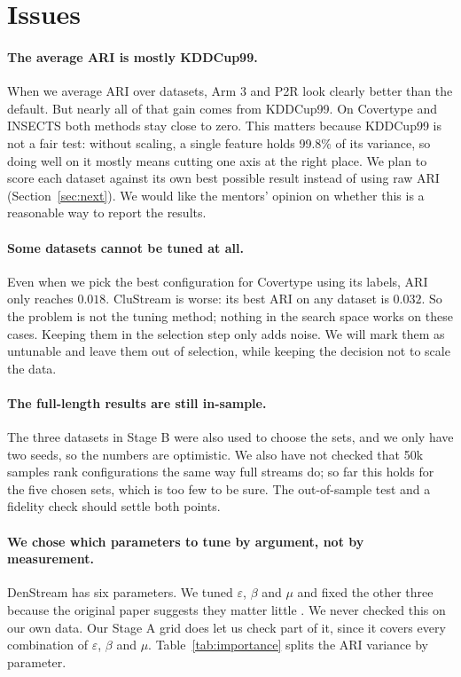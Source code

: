 \section{Issues}

\paragraph{The average ARI is mostly KDDCup99.}
When we average ARI over datasets, Arm 3 and P2R look clearly better than the default. But nearly all of that gain comes from KDDCup99. On Covertype and INSECTS both methods stay close to zero. This matters because KDDCup99 is not a fair test: without scaling, a single feature holds 99.8\% of its variance, so doing well on it mostly means cutting one axis at the right place. We plan to score each dataset against its own best possible result instead of using raw ARI (Section~\ref{sec:next}). We would like the mentors' opinion on whether this is a reasonable way to report the results.

\paragraph{Some datasets cannot be tuned at all.}
Even when we pick the best configuration for Covertype using its labels, ARI only reaches $0.018$. CluStream is worse: its best ARI on any dataset is $0.032$. So the problem is not the tuning method; nothing in the search space works on these cases. Keeping them in the selection step only adds noise. We will mark them as untunable and leave them out of selection, while keeping the decision not to scale the data.

\paragraph{The full-length results are still in-sample.}
The three datasets in Stage B were also used to choose the sets, and we only have two seeds, so the numbers are optimistic. We also have not checked that 50k samples rank configurations the same way full streams do; so far this holds for the five chosen sets, which is too few to be sure. The out-of-sample test and a fidelity check should settle both points.

\paragraph{We chose which parameters to tune by argument, not by measurement.}
DenStream has six parameters. We tuned $\varepsilon$, $\beta$ and $\mu$ and fixed the other three because the original paper suggests they matter little \cite{cao2006denstream}. We never checked this on our own data. Our Stage A grid does let us check part of it, since it covers every combination of $\varepsilon$, $\beta$ and $\mu$. Table~\ref{tab:importance} splits the ARI variance by parameter.

